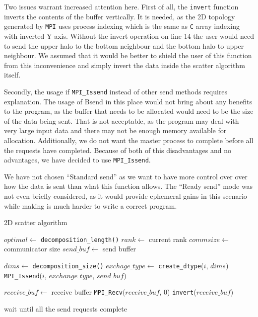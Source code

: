 \documentclass[11pt,a4paper]{article}
\begin{document}
Two issues warrant increased attention here. 
First of all, the \texttt{invert} function inverts the contents of the buffer vertically. 
It is needed, as the 2D topology generated by \texttt{MPI} uses process indexing which is the same as \texttt{C} array indexing with inverted Y axis. 
Without the invert operation on line 14 the user would need to send the upper halo to the bottom neighbour and the bottom halo to upper neighbour. 
We assumed that it would be better to shield the user of this function from this inconvenience and simply invert the data inside the scatter algorithm itself. 

Secondly, the usage if \texttt{MPI\_Issend} instead of other send methods requires explanation. 
The usage of Bsend in this place would not bring about any benefits to the program, as the buffer that needs to be allocated would need to be the size of the data being sent. 
That is not acceptable, as the program may deal with very large input data and there may not be enough memory available for allocation. 
Additionally, we do not want the master process to complete before all the requests have completed. 
Because of both of this disadvantages and no advantages, we have decided to use \texttt{MPI\_Issend}.

We have not chosen ``Standard send'' as we want to have more control over over how the data is sent than what this function allows. 
The ``Ready send'' mode was not even briefly considered, as it would provide ephemeral gains in this scenario while making is much harder to write a correct program.
\begin{algorithm}
    \caption{2D scatter algorithm}\label{2dscat}
    \begin{algorithmic}[1]
        \State $optimal\gets$ \texttt{decomposition\_length()}
        \State $rank\gets$ current rank
        \State $commsize\gets$ communicator size
        \State $send\_buf\gets$ send buffer

        \State $dims\gets$ \texttt{decomposition\_size()}
                \State $exchage\_type\gets$ \texttt{create\_dtype}($i$, $dims$)
                \State \texttt{MPI\_Issend}($i$, $exchange\_type$, $send\_buf$)
            \EndFor
        \EndIf

        \State $receive\_buf\gets$ receive buffer
        \State \texttt{MPI\_Recv}($receive\_buf$, $0$)
        \State \texttt{invert}($receive\_buf$)

            wait until all the send requests complete
        \EndIf
    \end{algorithmic}
\end{algorithm}
\end{document}
